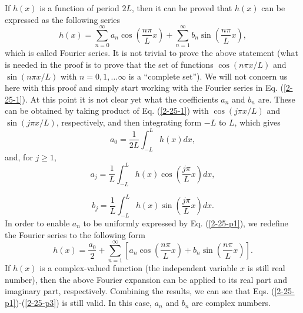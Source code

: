 \documentclass{article}
\begin{document}
If $h (x)$ is a function of period $2 L$, then it can be proved that $h (x)$
can be expressed as the following series
\begin{equation}
  \label{2-25-1} h (x) = \sum_{n = 0}^{\infty} a_n \cos \left( \frac{n \pi}{L}
  x \right) + \sum_{n = 1}^{\infty} b_n \sin \left( \frac{n \pi}{L} x \right),
\end{equation}
which is called Fourier series. It is not trivial to prove the above statement
(what is needed in the proof is to prove that the set of functions $\cos (n
\pi x / L)$ and $\sin (n \pi x / L)$ with $n = 0, 1, \ldots \infty$ is a
``complete set''{\cite{snieder1994}}). We will not concern us here with this
proof and simply start working with the Fourier series in Eq. (\ref{2-25-1}).
At this point it is not clear yet what the coefficients $a_n$ and $b_n$ are.
These can be obtained by taking product of Eq. (\ref{2-25-1}) with $\cos (j
\pi x / L)$ and $\sin (j \pi x / L)$, respectively, and then integrating form
$- L$ to $L$, which gives
\begin{equation}
  a_0 = \frac{1}{2 L} \int_{- L}^L h (x) d x,
\end{equation}
and, for $j \geqslant 1$,
\begin{equation}
  \label{2-25-p1} a_j = \frac{1}{L} \int_{- L}^L h (x) \cos \left( \frac{j
  \pi}{L} x \right) d x,
\end{equation}

\begin{equation}
  \label{2-25-p1m} b_j = \frac{1}{L} \int_{- L}^L h (x) \sin \left( \frac{j
  \pi}{L} x \right) d x.
\end{equation}
In order to enable $a_n$ to be uniformly expressed by Eq. (\ref{2-25-p1}), we
redefine the Fourier series to the following form
\begin{equation}
  \label{2-25-p3} h (x) = \frac{a_0}{2} + \sum_{n = 1}^{\infty} \left[ a_n
  \cos \left( \frac{n \pi}{L} x \right) + b_n \sin \left( \frac{n \pi}{L} x
  \right) \right] .
\end{equation}
If $h (x)$ is a complex-valued function (the independent variable $x$ is still
real number), then the above Fourier expansion can be applied to its real part
and imaginary part, respectively. Combining the results, we can see that Eqs.
(\ref{2-25-p1})-(\ref{2-25-p3}) is still valid. In this case, $a_n$ and $b_n$
are complex numbers.
\end{document}
